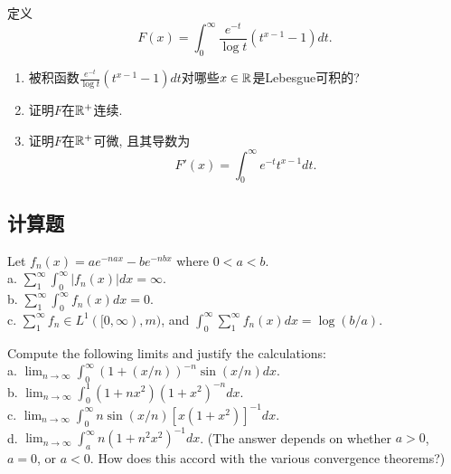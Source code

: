 
\begin{exercise}
定义
$$F(x)=\int_0^{\infty} \frac{e^{-t}}{\log t}\left(t^{x-1}-1\right)dt.$$
\begin{enumerate}
    \item 被积函数$\frac{e^{-t}}{\log t}\left(t^{x-1}-1\right)dt$对哪些$x \in \mathbb{R}$是Lebesgue可积的?
    \item 证明$F$在$\mathbb{R}^+$连续.
    \item 证明$F$在$\mathbb{R}^+$可微, 且其导数为
    $$F'(x)=\int_0^{\infty} e^{-t} t^{x-1} dt.$$
\end{enumerate}
\end{exercise}


\subsection{计算题}
\begin{exercise}
    Let $f_n(x)=a e^{-n a x}-b e^{-n b x}$ where $0<a<b$. \\
    a. $\sum_1^{\infty} \int_0^{\infty}\left|f_n(x)\right| d x=\infty$. \\
    b. $\sum_1^{\infty} \int_0^{\infty} f_n(x) d x=0$. \\
    c. $\sum_1^{\infty} f_n \in L^1([0, \infty), m)$, and $\int_0^{\infty} \sum_1^{\infty} f_n(x) d x=\log (b / a)$.
\end{exercise}
\begin{exercise}
    Compute the following limits and justify the calculations: \\
    a. $\lim _{n \rightarrow \infty} \int_0^{\infty}(1+(x / n))^{-n} \sin (x / n) d x$. \\
    b. $\lim _{n \rightarrow \infty} \int_0^1\left(1+n x^2\right)\left(1+x^2\right)^{-n} d x$. \\
    c. $\lim _{n \rightarrow \infty} \int_0^{\infty} n \sin (x / n)\left[x\left(1+x^2\right)\right]^{-1} d x$. \\
    d. $\lim _{n \rightarrow \infty} \int_a^{\infty} n\left(1+n^2 x^2\right)^{-1} d x$. (The answer depends on whether $a>0$, $a=0$, or $a<0$. How does this accord with the various convergence theorems?)
\end{exercise}

